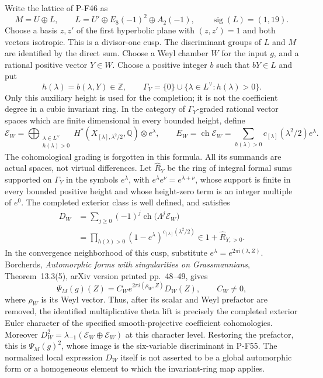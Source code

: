 Write the lattice of P-F46 as
\[
 M=U\oplus L,\qquad
 L=U'\oplus E_8(-1)^2\oplus A_2(-1),
 \qquad \operatorname{sig}(L)=(1,19).
 \tag{P-F53h}
\]
Choose a basis $z,z'$ of the first hyperbolic plane with
$(z,z')=1$ and both vectors isotropic. This is a divisor-one
cusp. The discriminant groups of $L$ and $M$ are identified by
the direct sum. Choose a Weyl chamber $W$ for the input $g$,
and a rational positive vector $Y\in W$. Choose a positive integer
$b$ such that $bY\in L$ and put
\[
 h(\lambda)=b(\lambda,Y)\in\mathbb Z,
 \qquad
 \Gamma_Y=\{0\}\cup\{\lambda\in L^\vee:h(\lambda)>0\}.
 \tag{P-F53i}
\]
Only this auxiliary height is used for the completion; it is
not the coefficient degree in a cubic invariant ring.
In the category of $\Gamma_Y$-graded rational vector spaces
which are finite dimensional in every bounded height, define
\[
 \mathcal E_W=
 \bigoplus_{\substack{\lambda\in L^\vee\\h(\lambda)>0}}
 H^*\!\left(X_{[\lambda],\lambda^2/2},\mathbb Q\right)
                         \otimes e^\lambda,
 \qquad
 E_W=\operatorname{ch}\mathcal E_W
     =\sum_{h(\lambda)>0}c_{[\lambda]}(\lambda^2/2)e^\lambda.
 \tag{P-F53j}
\]
The cohomological grading is forgotten in this formula.
All its summands are actual spaces, not virtual differences.
Let $\widehat R_Y$ be the ring of integral formal sums supported
on $\Gamma_Y$ in the symbols $e^\lambda$, with
$e^\lambda e^\nu=e^{\lambda+\nu}$,
whose support is finite in every bounded positive height and
whose height-zero term is an integer multiple of $e^0$.
The completed exterior class is well defined, and satisfies
\[
 \begin{split}
 D_W&=\sum_{j\ge0}(-1)^j
                  \operatorname{ch}\bigl(\Lambda^j\mathcal E_W\bigr)\\
    &=\prod_{h(\lambda)>0}
          (1-e^\lambda)^{c_{[\lambda]}(\lambda^2/2)}
       \in 1+\widehat R_{Y,>0}.
 \end{split}
 \tag{P-F53k}
\]
In the convergence neighborhood of this cusp, substitute
$e^\lambda=e^{2\pi i(\lambda,Z)}$. Borcherds,
\emph{Automorphic forms with singularities on Grassmannians},
Theorem~13.3(5), arXiv version printed pp.~48--49, gives
\[
 \Psi_M(g)(Z)=C_W e^{2\pi i(\rho_W,Z)}D_W(Z),
                       \qquad C_W\ne0,
 \tag{P-F53l}
\]
where $\rho_W$ is its Weyl vector. Thus, after its scalar and
Weyl prefactor are removed, the identified multiplicative
theta lift is precisely the completed exterior Euler character
of the specified smooth-projective coefficient cohomologies.
Moreover $D_W^2=\lambda_{-1}(\mathcal E_W\oplus\mathcal E_W)$
at this character level. Restoring the prefactor, this is
$\Psi_M(g)^2$, whose image is the six-variable discriminant
in P-F55. The normalized local expression $D_W$ itself is
not asserted to be a global automorphic form or a homogeneous
element to which the invariant-ring map applies.

